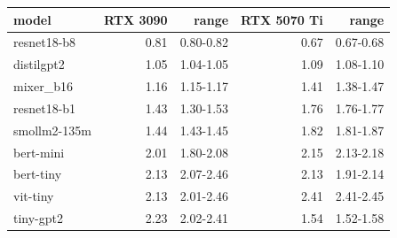 \begin{tabular}{lrrrr}
\toprule
model & RTX 3090 & range & RTX 5070 Ti & range \\
\midrule
resnet18-b8 & 0.81 & 0.80-0.82 & 0.67 & 0.67-0.68 \\
distilgpt2 & 1.05 & 1.04-1.05 & 1.09 & 1.08-1.10 \\
mixer\_b16 & 1.16 & 1.15-1.17 & 1.41 & 1.38-1.47 \\
resnet18-b1 & 1.43 & 1.30-1.53 & 1.76 & 1.76-1.77 \\
smollm2-135m & 1.44 & 1.43-1.45 & 1.82 & 1.81-1.87 \\
bert-mini & 2.01 & 1.80-2.08 & 2.15 & 2.13-2.18 \\
bert-tiny & 2.13 & 2.07-2.46 & 2.13 & 1.91-2.14 \\
vit-tiny & 2.13 & 2.01-2.46 & 2.41 & 2.41-2.45 \\
tiny-gpt2 & 2.23 & 2.02-2.41 & 1.54 & 1.52-1.58 \\
\bottomrule
\end{tabular}
